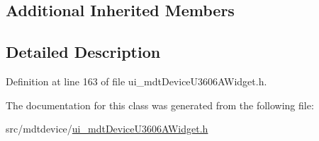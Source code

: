 \subsection*{Additional Inherited Members}


\subsection{Detailed Description}


Definition at line 163 of file ui\-\_\-mdt\-Device\-U3606\-A\-Widget.\-h.



The documentation for this class was generated from the following file\-:\begin{DoxyCompactItemize}
\item 
src/mdtdevice/\hyperlink{ui__mdt_device_u3606_a_widget_8h}{ui\-\_\-mdt\-Device\-U3606\-A\-Widget.\-h}\end{DoxyCompactItemize}
